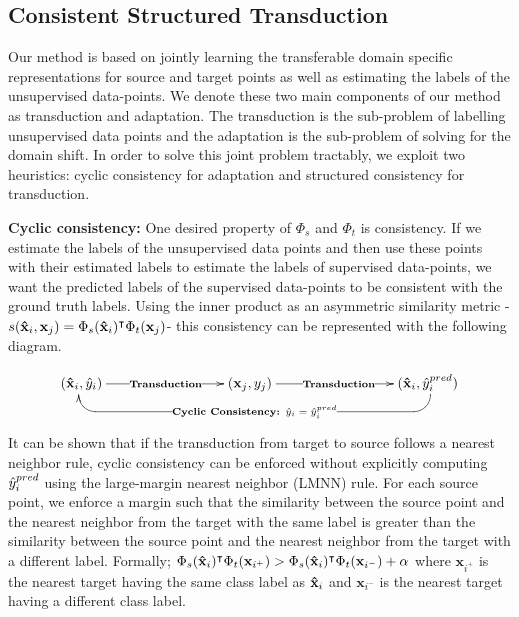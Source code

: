 \subsection{Consistent Structured Transduction}
Our method is based on jointly learning the transferable domain specific representations for source and target points as well as estimating the labels of the unsupervised data-points. We denote these two main components of our method as transduction and adaptation. The transduction is the sub-problem of labelling unsupervised data points and the adaptation is the sub-problem of solving for the domain shift. In order to solve this joint problem tractably, we exploit two heuristics: cyclic consistency for adaptation and structured consistency for transduction. 

\textbf{Cyclic consistency:} One desired property of  $\Phi_s$ and $\Phi_t$ is consistency. If we estimate the labels of the unsupervised data points and then use these points with their estimated labels to estimate the labels of supervised data-points, we want the predicted labels of the supervised data-points to be consistent with the ground truth labels. Using the inner product as an asymmetric similarity metric -$s(\mathbf{\hat{x}}_i, \mathbf{x}_j) = \Phi_s(\mathbf{\hat{x}}_i)^\intercal \Phi_t(\mathbf{x}_j)$- this consistency can be represented with the following diagram.

\begin{displaymath}
    \xymatrix{
        (\xsi,\ysi) \ar@{<-}@<-2pt>`d[r] `[rrrrrr]|{\textbf{Cyclic Consistency: $\ysi = \ysi^{pred}$}} [rrrrrr]  \ar[rrr]|{\textbf{Transduction}}     &&& (\xuj, \yuj) \ar[rrr]|{\textbf{Transduction}} &&&  (\xsi,\ysi^{pred}) }
\end{displaymath}

It can be shown that if the transduction from target to source follows a nearest neighbor rule, cyclic consistency can be enforced without explicitly computing $\hat{y}_i^{pred}$ using the large-margin nearest neighbor (LMNN)\cite{lmnn} rule. For each source point, we enforce a margin such that the similarity between the source point and the nearest neighbor from the target with the same label is greater than the similarity between the source point and the nearest neighbor from the target with a different label. Formally; $ \Phi_s(\mathbf{\hat{x}}_i)^\intercal \Phi_t(\mathbf{x}_{i^+}) > \Phi_s(\mathbf{\hat{x}}_i)^\intercal \Phi_t(\mathbf{x}_{i^-}) + \alpha$ where $\mathbf{x}_{i^+}$ is the nearest target having the same class label as $\mathbf{\hat{x}}_i$ and $\mathbf{x}_{i^-}$ is the nearest target having a different class label. 


